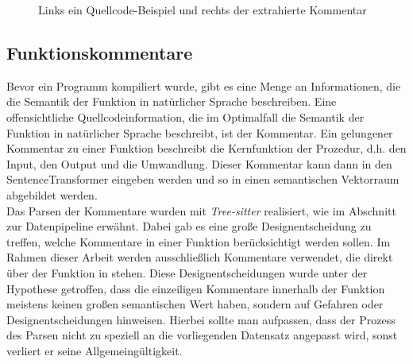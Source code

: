 \documentclass[12pt,letterpaper,ngerman]{article}
\begin{document}
\begin{figure}
  \begin{center}
    \begin{minipage}[c]{6cm}
        \centering
        \inputminted[fontsize=\scriptsize]{c}{comments.c}
    \end{minipage}
    \hspace{0.1cm}
    \begin{minipage}[c]{6cm}
        \centering
        \inputminted[fontsize=\scriptsize]{json}{comments.json}
    \end{minipage}
  \end{center}
  \caption{Links ein Quellcode-Beispiel und rechts der extrahierte Kommentar}
\end{figure}

\subsection{Funktionskommentare}
Bevor ein Programm kompiliert wurde, gibt es eine Menge an
Informationen, die die Semantik der Funktion in natürlicher Sprache 
beschreiben. Eine offensichtliche Quellcodeinformation, die im
Optimalfall die Semantik der Funktion in natürlicher Sprache 
beschreibt, ist der Kommentar. Ein gelungener Kommentar zu einer
Funktion beschreibt die Kernfunktion der Prozedur, d.h. den Input,
den Output und die Umwandlung. Dieser Kommentar kann dann in den 
SentenceTransformer eingeben werden und so in einen semantischen 
Vektorraum abgebildet werden.\\
Das Parsen der Kommentare wurden mit \textit{Tree-sitter} realisiert,
wie im Abschnitt zur Datenpipeline erwähnt. Dabei gab es eine große
Designentscheidung zu treffen, welche Kommentare in einer Funktion
berücksichtigt werden sollen.
Im Rahmen dieser Arbeit werden ausschließlich Kommentare verwendet,
die direkt  über der Funktion in stehen. Diese Designentscheidungen
wurde unter der Hypothese getroffen, dass die einzeiligen
Kommentare innerhalb der Funktion meistens keinen großen
semantischen Wert haben, sondern auf Gefahren oder Designentscheidungen
hinweisen.
Hierbei sollte man aufpassen, dass der Prozess des Parsen nicht zu
speziell an die vorliegenden Datensatz angepasst wird, sonst 
verliert er seine Allgemeingültigkeit. 
\end{document}
